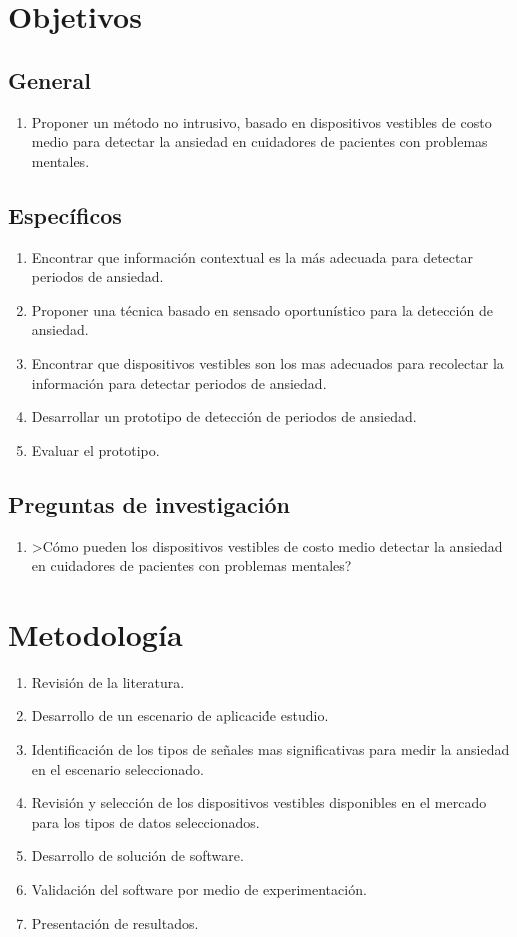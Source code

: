 \documentclass[letterpaper,12pt]{cicese}
\begin{document}
		\chapter{Objetivos}
			\section{General}
				\begin{enumerate}
					\item Proponer un m\'etodo no intrusivo, basado en dispositivos vestibles de costo medio para detectar la ansiedad en cuidadores de pacientes con problemas mentales.
				\end{enumerate}
			\section{Espec\'ificos}
				\begin{enumerate}
					\item Encontrar que informaci\'on contextual es la m\'as adecuada para detectar periodos de ansiedad.
					\item Proponer una t\'ecnica basado en sensado oportun\'istico para la detecci\'on de ansiedad.
					\item Encontrar que dispositivos vestibles son los mas adecuados para recolectar la informaci\'on para detectar periodos de ansiedad.
					\item Desarrollar un prototipo de detecci\'on de periodos de ansiedad.
					\item Evaluar el prototipo.
				\end{enumerate}
			\section{Preguntas de investigaci\'on}
				\begin{enumerate}
					\item >C\'omo pueden los dispositivos vestibles de costo medio detectar la ansiedad en cuidadores de pacientes con problemas mentales?
				\end{enumerate}
		\chapter{Metodolog\'ia}
				\begin{enumerate}
					\item Revisi\'on de la literatura.
					\item Desarrollo de un escenario de aplicaci\'de estudio.
					\item Identificaci\'on de los tipos de se\~nales mas significativas para medir la ansiedad en el escenario seleccionado.
					\item Revisi\'on y selecci\'on de los dispositivos vestibles disponibles en el mercado para los tipos de datos seleccionados.
					\item Desarrollo de soluci\'on de software.
					\item Validaci\'on del software por medio de experimentaci\'on.
					\item Presentaci\'on de resultados.
				\end{enumerate}
\end{document}
